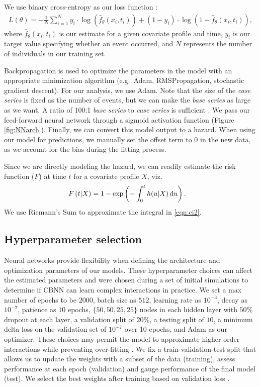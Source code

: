\documentclass[AMA,STIX1COL,]{WileyNJD-v2}
\begin{document}
We use binary cross-entropy as our loss function \citep{gulli2017}:
\begin{align*}
L(\theta)=-\frac{1}{N} \sum^{N}_{i=1} y_{i} \cdot \log(\hat{f}_{\theta}(x_{i}, t_{i}) ) + (1-y_{i} )\cdot \log(1-\hat{f}_{\theta}(x_{i}, t_{i}) ),
\end{align*} where \(\hat{f}_{\theta}(x_{i}, t_{i})\) is our estimate
for a given covariate profile and time, \(y_{i}\) is our target value
specifying whether an event occurred, and \(N\) represents the number of
individuals in our training set.

Backpropagation is used to optimize the parameters in the model with an
appropriate minimization algorithm (e.g.~Adam, RMSPropagation,
stochastic gradient descent)\citep{gulli2017}. For our analysis, we use
Adam. Note that the size of the \emph{case series} is fixed as the
number of events, but we can make the \emph{base series} as large as we
want. A ratio of 100:1 \emph{base series} to \emph{case series} is
sufficient \citep{hanley2009}. We pass our feed-forward neural network
through a sigmoid activation function (Figure \ref{fig:NNarch}).
Finally, we can convert this model output to a hazard. When using our
model for predictions, we manually set the offset term to 0 in the new
data, as we account for the bias during the fitting process.

Since we are directly modeling the hazard, we can readily estimate the
risk function (\(F\)) at time \(t\) for a covariate profile \(X\),
viz.\begin{align}\label{eqn:ci2}
F\left(t|X\right)& = 1 - \exp\left(-\int_{0}^{t}h(u|X) \,\textrm du\right).
\end{align} We use Riemann's Sum \citep{hughes2020calculus} to
approximate the integral in \eqref{eqn:ci2}.

\hypertarget{hyperparameter-selection}{%
\subsection{Hyperparameter selection}\label{hyperparameter-selection}}

Neural networks provide flexibility when defining the architecture and
optimization parameters of our models. These hyperparameter choices can
affect the estimated parameters and were chosen during a set of initial
simulations to determine if CBNN can learn complex interactions in
practice. We set a max number of epochs to be \(2000\), batch size as
\(512\), learning rate as \(10^{-3}\), decay as \(10^{-7}\), patience as
\(10\) epochs, \(\{50,50,25,25\}\) nodes in each hidden layer with
\(50\%\) dropout at each layer, a validation split of \(20\%\), a
testing split of \(10%
\), a minimum delta loss on the validation set of \(10^{-7}\) over 10
epochs, and Adam \citep{gulli2017} as our optimizer. These choices may
permit the model to approximate higher-order interactions while
preventing over-fitting \citep{srivastava2014dropout}. We fix a
train-validation-test split that allows us to update the weights with a
subset of the data (training), assess performance at each epoch
(validation) and gauge performance of the final model (test). We select
the best weights after training based on validation loss
\citep{gulli2017}.
\end{document}
